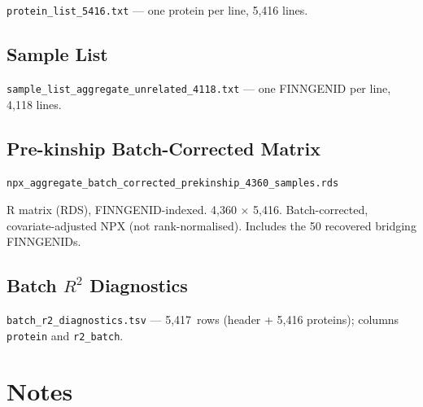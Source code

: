 \documentclass[11pt,a4paper]{article}
\begin{document}
\texttt{protein\_list\_5416.txt} --- one protein per line, 5,416 lines.

\subsection{Sample List}

\texttt{sample\_list\_aggregate\_unrelated\_4118.txt} --- one FINNGENID per
line, 4,118 lines.

\subsection{Pre-kinship Batch-Corrected Matrix}

\texttt{npx\_aggregate\_batch\_corrected\allowbreak\_prekinship\_4360\_samples.rds}

R matrix (RDS), FINNGENID-indexed. 4,360 $\times$ 5,416. Batch-corrected,
covariate-adjusted NPX (not rank-normalised). Includes the 50 recovered
bridging FINNGENIDs.

\subsection{Batch $R^{2}$ Diagnostics}

\texttt{batch\_r2\_diagnostics.tsv} --- 5,417~rows (header + 5,416
proteins); columns \texttt{protein} and \texttt{r2\_batch}.

\section{Notes}
\end{document}
